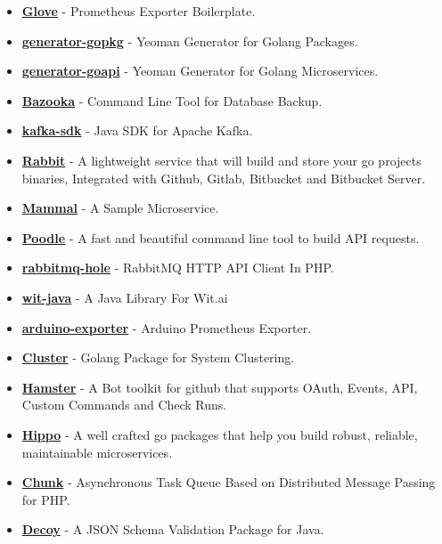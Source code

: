 \documentclass[paper=a4,fontsize=11pt]{scrartcl} %
\begin{document}
\begin{itemize}
\item \textbf{\href{https://github.com/Clivern/Glove}{Glove}} - Prometheus Exporter Boilerplate.
\item \textbf{\href{https://github.com/Clivern/generator-gopkg}{generator-gopkg}} - Yeoman Generator for Golang Packages.
\item \textbf{\href{https://github.com/Clivern/generator-goapi}{generator-goapi}} - Yeoman Generator for Golang Microservices.
\item \textbf{\href{https://github.com/Clivern/Bazooka}{Bazooka}} - Command Line Tool for Database Backup.
\item \textbf{\href{https://github.com/Clivern/kafka-sdk}{kafka-sdk}} - Java SDK for Apache Kafka.
\item \textbf{\href{https://github.com/Clivern/Rabbit}{Rabbit}} - A lightweight service that will build and store your go projects binaries, Integrated with Github, Gitlab, Bitbucket and Bitbucket Server.
\item \textbf{\href{https://github.com/Clivern/Mammal}{Mammal}} - A Sample Microservice.
\item \textbf{\href{https://github.com/Clivern/Poodle}{Poodle}} - A fast and beautiful command line tool to build API requests.
\item \textbf{\href{https://github.com/Clivern/rabbitmq-hole}{rabbitmq-hole}} - RabbitMQ HTTP API Client In PHP.
\item \textbf{\href{https://github.com/Clivern/wit-java}{wit-java}} - A Java Library For Wit.ai
\item \textbf{\href{https://github.com/Clivern/arduino_exporter}{arduino-exporter}} - Arduino Prometheus Exporter.
\item \textbf{\href{https://github.com/Clivern/Cluster}{Cluster}} - Golang Package for System Clustering.
\item \textbf{\href{https://github.com/Clivern/Hamster}{Hamster}} - A Bot toolkit for github that supports OAuth, Events, API, Custom Commands and Check Runs.
\item \textbf{\href{https://github.com/Clivern/Hippo}{Hippo}} - A well crafted go packages that help you build robust, reliable, maintainable microservices.
\item \textbf{\href{https://github.com/Clivern/Chunk}{Chunk}} - Asynchronous Task Queue Based on Distributed Message Passing for PHP.
\item \textbf{\href{https://github.com/Clivern/Decoy}{Decoy}} - A JSON Schema Validation Package for Java.

\end{itemize}
\end{document}
